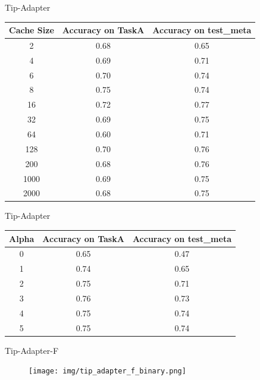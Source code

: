 \documentclass[11pt,compress]{beamer} %
\begin{document}
\begin{frame}{Tip-Adapter}
    \begin{table}[H]
      \centering
      \begin{tabular}{|c|c|c|}
      \hline
      \textbf{Cache Size} & \textbf{Accuracy on TaskA} & \textbf{Accuracy on test\_meta} \\ \hline
      2    & 0.68 & 0.65 \\ \hline
      4    & 0.69 & 0.71 \\ \hline
      6    & 0.70 & 0.74 \\ \hline
      8    & 0.75 & 0.74 \\ \hline
      16   & 0.72 & 0.77 \\ \hline
      32   & 0.69 & 0.75 \\ \hline
      64   & 0.60 & 0.71 \\ \hline
      128  & 0.70 & 0.76 \\ \hline
      200  & 0.68 & 0.76 \\ \hline
      1000 & 0.69 & 0.75 \\ \hline
      2000 & 0.68 & 0.75 \\ \hline
      \end{tabular}
      \label{tab:cache}
    \end{table}  
  \end{frame}

  \begin{frame}{Tip-Adapter}
    \begin{table}[H]
      \centering
      \begin{tabular}{|c|c|c|}
      \hline
      \textbf{Alpha} & \textbf{Accuracy on TaskA} & \textbf{Accuracy on test\_meta} \\ \hline
      0 & 0.65 & 0.47 \\ \hline
      1 & 0.74 & 0.65 \\ \hline
      2 & 0.75 & 0.71 \\ \hline
      3 & 0.76 & 0.73 \\ \hline
      4 & 0.75 & 0.74 \\ \hline
      5 & 0.75 & 0.74 \\ \hline
      \end{tabular}
      \label{tab:alpha}
    \end{table}  
\end{frame}

\begin{frame}{Tip-Adapter-F}
  \centering
  \begin{figure}
    \texttt{[image: img/tip\_adapter\_f\_binary.png]}
  \end{figure}
\end{frame}
\end{document}

